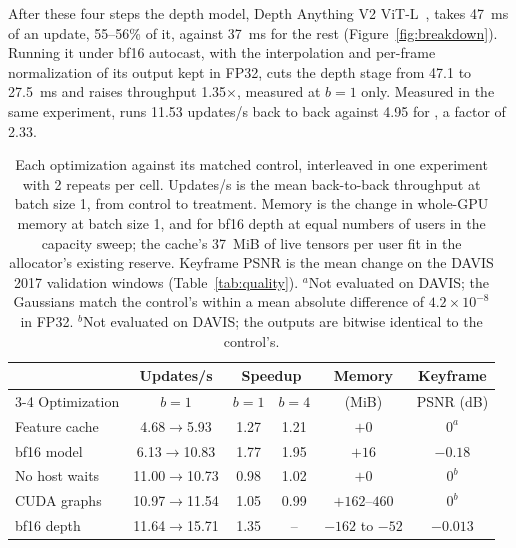 After these four steps the depth model, Depth Anything V2 ViT-L~\cite{depthanythingv2}, takes 47~ms of an update, 55--56\% of it, against 37~ms for the rest (Figure~\ref{fig:breakdown}). %
Running it under bf16 autocast, with the interpolation and per-frame normalization of its output kept in FP32, cuts the depth stage from 47.1 to 27.5~ms and raises throughput 1.35$\times$, measured at $b=1$ only. %
Measured in the same experiment, \opt{} runs 11.53 updates/s back to back against 4.95 for \serial{}, a factor of 2.33. %

\begin{table}[t]
\centering
\footnotesize
\setlength{\tabcolsep}{3pt}
\begin{tabular}{@{}lccccc@{}}
\toprule
 & Updates/s & \multicolumn{2}{c}{Speedup} & Memory & Keyframe \\
\cmidrule(lr){3-4}
Optimization & $b=1$ & $b=1$ & $b=4$ & (MiB) & PSNR (dB) \\ %
\midrule
Feature cache & 4.68$\to$5.93 & 1.27 & 1.21 & $+0$ & $0^{a}$ \\ %
bf16 model & 6.13$\to$10.83 & 1.77 & 1.95 & $+16$ & $-0.18$ \\ %
No host waits & 11.00$\to$10.73 & 0.98 & 1.02 & $+0$ & $0^{b}$ \\ %
CUDA graphs & 10.97$\to$11.54 & 1.05 & 0.99 & $+162$--$460$ & $0^{b}$ \\ %
bf16 depth & 11.64$\to$15.71 & 1.35 & -- & $-162$ to $-52$ & $-0.013$ \\ %
\bottomrule
\end{tabular}
\caption{Each optimization against its matched control, interleaved in one experiment with 2 repeats per cell. %
Updates/s is the mean back-to-back throughput at batch size 1, from control to treatment. %
Memory is the change in whole-GPU memory at batch size 1, and for bf16 depth at equal numbers of users in the capacity sweep; the cache's 37~MiB of live tensors per user fit in the allocator's existing reserve. %
Keyframe PSNR is the mean change on the DAVIS 2017 validation windows (Table~\ref{tab:quality}). %
$^{a}$Not evaluated on DAVIS; the Gaussians match the control's within a mean absolute difference of $4.2\times10^{-8}$ in FP32. %
$^{b}$Not evaluated on DAVIS; the outputs are bitwise identical to the control's.} %
\label{tab:ablation}
\end{table}

